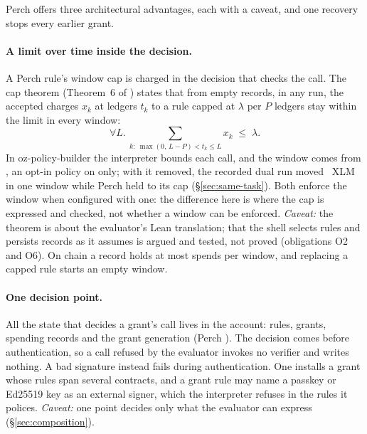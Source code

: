 Perch offers three architectural advantages, each with a caveat, and one
recovery stops every earlier grant.

\paragraph{A limit over time inside the decision.} A Perch rule's window cap is
charged in the decision that checks the call. The cap theorem (Theorem~6 of
) states that from empty records, in any run, the accepted
charges $x_k$ at ledgers $t_k$ to a rule capped at $\lambda$ per $P$ ledgers stay
within the limit in every window:
\[
  \forall L.\ \sum_{k:\ \max(0,\,L-P) < t_k \le L} x_k \;\le\; \lambda .
\]
In oz-policy-builder the interpreter bounds each call, and the window comes from
, an opt-in policy on  only; with it removed,
the recorded dual run moved ~XLM in one window
while Perch held to its cap (\S\ref{sec:same-task}). Both enforce the window
when configured with one: the difference here is where the cap is expressed
and checked, not whether a window can be enforced. \emph{Caveat:} the theorem
is about the evaluator's Lean translation; that the shell selects rules and
persists records as it assumes is argued and tested, not proved (obligations O2
and O6). On chain a record holds at most  spends per
window, and replacing a capped rule starts an empty window.

\paragraph{One decision point.} All the state that decides a grant's call lives
in the account: rules, grants, spending records and the grant generation
(Perch ). The decision comes before authentication, so a
call refused by the evaluator invokes no verifier and writes nothing. A bad
signature instead fails during authentication. One  installs a
grant whose rules span several contracts, and a grant rule may name a passkey or
Ed25519 key as an external signer, which the interpreter refuses in the rules it
polices. \emph{Caveat:} one point decides only what the evaluator can express
(\S\ref{sec:composition}).

